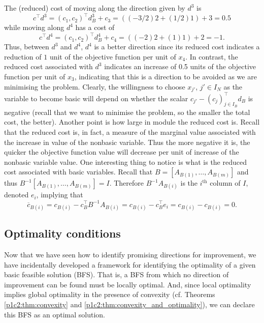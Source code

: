 The (reduced) cost of moving along the direction given by $d^3$ is 
%
\begin{equation*}
	c^\top d^3 = (c_1, c_2)^\top d_B^3 + c_3 = ((-3/2)2 + (1/2)1) + 3 = 0.5
\end{equation*}
%
while moving along $d^4$ has a cost of
\begin{equation*}
	c^\top d^4 = (c_1, c_2)^\top d_B^4 + c_4 = ((-2)2 + (1)1) + 2 = -1.
\end{equation*}
%
Thus, between $d^3$ and $d^4$, $d^4$ is a better direction since its reduced cost indicates a reduction of $1$ unit of the objective function per unit of $x_4$. In contrast, the reduced cost associated with $d^3$ indicates an increase of 0.5 units of the objective function per unit of $x_3$, indicating that this is a direction to be avoided as we are minimising the problem.
%
Clearly, the willingness to choose $x_{j'}$, $j' \in I_N$ as the variable to become basic will depend on whether the scalar $c_{j'} - (c_j)_{j \in I_B}^\top d_B$ is negative (recall that we want to minimise the problem, so the smaller the total cost, the better). Another point is how large in module the reduced cost is. Recall that the reduced cost is, in fact, a measure of the marginal value associated with the increase in value of the nonbasic variable. Thus the more negative it is, the quicker the objective function value will decrease per unit of increase of the nonbasic variable value.
%
One interesting thing to notice is what is the reduced cost associated with basic variables. Recall that $B = [A_{B(1)}, \dots, A_{B(m)}]$ and thus $B^{-1}[A_{B(1)}, \dots, A_{B(m)}] = I$. Therefore $B^{-1}A_{B(i)}$ is the $i^\text{th}$ column of $I$, denoted $e_i$, implying that
%
\begin{equation*}
	\overline{c}_{B(i)} = c_{B(i)} - c^\top_B B^{-1} A_{B(i)} = c_{B(i)} - c_B^\top e_i = c_{B(i)} - c_{B(i)} = 0.	
\end{equation*}


\subsection{Optimality conditions}

Now that we have seen how to identify promising directions for improvement, we have incidentally developed a framework for identifying the optimality of a given basic feasible solution (BFS). That is, a BFS from which no direction of improvement can be found must be locally optimal. And, since local optimality implies global optimality in the presence of convexity (cf. Theorems \ref{p1c2:thm:convexity} and \ref{p1c2:thm:convexity_and_optimality}), we can declare this BFS as an optimal solution. 

